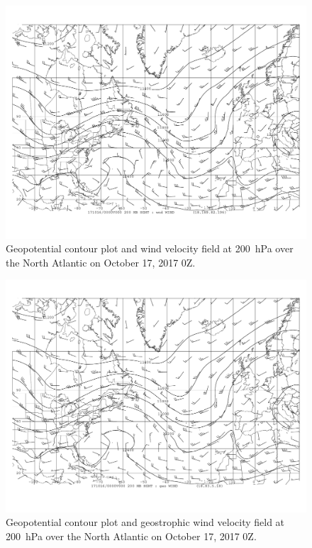 \documentclass[11pt]{article}
\begin{document}
\begin{figure}[h!]
	\centering
	\includegraphics[trim={0.5cm 2cm 0.5cm 0},clip,width=\textwidth]{200hPa_hght_wind_jet_inout}
	\caption{Geopotential contour plot and wind velocity field at \SI{200}{\hecto\Pa} over the North Atlantic on October 17, 2017 0Z.}
	\label{fig:jet}
\end{figure}

\begin{figure}[h!]
	\centering
	\includegraphics[trim={0.5cm 2cm 0.5cm 0},clip,width=\textwidth]{200hPa_hght_geowind_jet_inout}
	\caption{Geopotential contour plot and geostrophic wind velocity field at \SI{200}{\hecto\Pa} over the North Atlantic on October 17, 2017 0Z.}
	\label{fig:jet_geo}
\end{figure}
\end{document}
